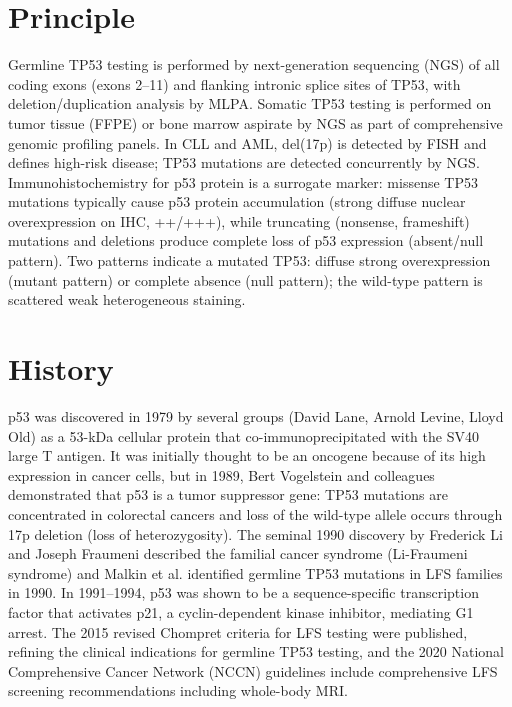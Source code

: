 \section*{Principle}
Germline TP53 testing is performed by next-generation sequencing (NGS) of all coding exons (exons 2--11) and flanking intronic splice sites of TP53, with deletion/duplication analysis by MLPA. Somatic TP53 testing is performed on tumor tissue (FFPE) or bone marrow aspirate by NGS as part of comprehensive genomic profiling panels. In CLL and AML, del(17p) is detected by FISH and defines high-risk disease; TP53 mutations are detected concurrently by NGS. Immunohistochemistry for p53 protein is a surrogate marker: missense TP53 mutations typically cause p53 protein accumulation (strong diffuse nuclear overexpression on IHC, ++/+++), while truncating (nonsense, frameshift) mutations and deletions produce complete loss of p53 expression (absent/null pattern). Two patterns indicate a mutated TP53: diffuse strong overexpression (mutant pattern) or complete absence (null pattern); the wild-type pattern is scattered weak heterogeneous staining.

\section*{History}
p53 was discovered in 1979 by several groups (David Lane, Arnold Levine, Lloyd Old) as a 53-kDa cellular protein that co-immunoprecipitated with the SV40 large T antigen. It was initially thought to be an oncogene because of its high expression in cancer cells, but in 1989, Bert Vogelstein and colleagues demonstrated that p53 is a tumor suppressor gene: TP53 mutations are concentrated in colorectal cancers and loss of the wild-type allele occurs through 17p deletion (loss of heterozygosity). The seminal 1990 discovery by Frederick Li and Joseph Fraumeni described the familial cancer syndrome (Li-Fraumeni syndrome) and Malkin et al. identified germline TP53 mutations in LFS families in 1990. In 1991--1994, p53 was shown to be a sequence-specific transcription factor that activates p21, a cyclin-dependent kinase inhibitor, mediating G1 arrest. The 2015 revised Chompret criteria for LFS testing were published, refining the clinical indications for germline TP53 testing, and the 2020 National Comprehensive Cancer Network (NCCN) guidelines include comprehensive LFS screening recommendations including whole-body MRI.

